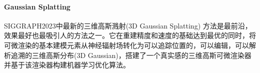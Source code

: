 \paragraph{Gaussian Splatting}

SIGGRAPH2023中最新的三维高斯溅射(3D Gaussian Splatting) \cite{kerbl3DGaussianSplatting2023} 方法是最前沿，效果最好也最吸引人的方法之一。它在重建精度和速度的基础达到最优的同时，将可微渲染的基本建模元素从神经辐射场转化为可以追踪位置的，可以编辑，可以解析追溯的三维高斯分布(3D Gaussian)，搭建了一个真实感的三维高斯可微渲染器并基于该渲染器构建机器学习优化算法。


